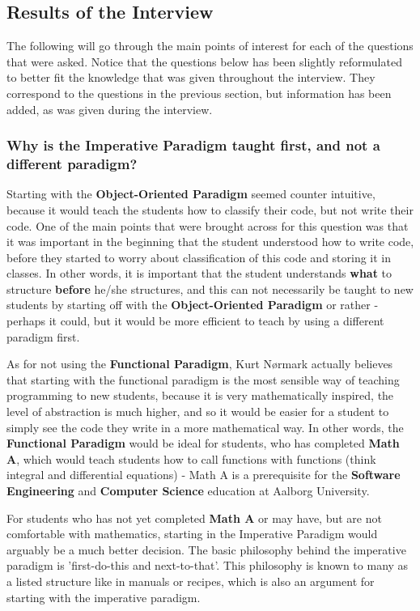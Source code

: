 \subsection{Results of the Interview}

The following will go through the main points of interest for each of the questions that were asked. Notice that the questions below has been slightly reformulated to better fit the knowledge that was given throughout the interview. They correspond to the questions in the previous section, but information has been added, as was given during the interview.

\subsubsection{Why is the Imperative Paradigm taught first, and not a different paradigm?}

Starting with the \textbf{Object-Oriented Paradigm} seemed counter intuitive, because it would teach the students how to classify their code, but not write their code. One of the main points that were brought across for this question was that it was important in the beginning that the student understood how to write code, before they started to worry about classification of this code and storing it in classes. In other words, it is important that the student understands \textbf{what} to structure \textbf{before} he/she structures, and this can not necessarily be taught to new students by starting off with the \textbf{Object-Oriented Paradigm} or rather - perhaps it could, but it would be more efficient to teach by using a different paradigm first. 


As for not using the \textbf{Functional Paradigm}, Kurt N{\o}rmark actually believes that starting with the functional paradigm is the most sensible way of teaching programming to new students, because it is very mathematically inspired, the level of abstraction is much higher, and so it would be easier for a student to simply see the code they write in a more mathematical way. In other words, the \textbf{Functional Paradigm} would be ideal for students, who has completed \textbf{Math A}, which would teach students how to call functions with functions (think integral and differential equations) - Math A is a prerequisite for the \textbf{Software Engineering} and \textbf{Computer Science} education at Aalborg University.


For students who has not yet completed \textbf{Math A} or may have, but are not comfortable with mathematics, starting in the Imperative Paradigm would arguably be a much better decision. The basic philosophy behind the imperative paradigm is 'first-do-this and next-to-that'. This philosophy is known to many as a listed structure like in manuals or recipes, which is also an argument for starting with the imperative paradigm.


